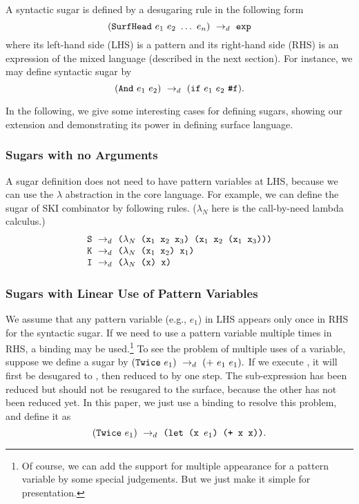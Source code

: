 A syntactic sugar  is defined by a desugaring rule in the following form
\[
\drule{(\m{SurfHead}~e_1~e_2~\ldots~e_n)}{\m{exp}} %
\]
where its left-hand side (LHS) is a pattern and its right-hand side (RHS) is an expression of the mixed language (described in the next section).
For instance, we may define syntactic sugar  by
\[
(\mbox{\tt And}~e_1~e_2) ~\rightarrow_d~ (\mbox{\tt if}~e_1~e_2~\mbox{\tt \#f}).
\]

In the following, we give some interesting cases for defining sugars, showing our extension and demonstrating its power in defining surface language.

\subsubsection{Sugars with no Arguments}
\label{mark:SKI}
A sugar definition does not need to have pattern variables at LHS, because we can use the $\lambda$ abstraction in the core language. For example, we can define the sugar of SKI combinator by following rules. ($\lambda_N$ here is the call-by-need lambda calculus.)
\[
\begin{array}{l}
\mbox{\tt S} ~\rightarrow_d~ \texttt{($\lambda_N$ ($\mbox{\tt x}_1$ $\mbox{\tt x}_2$ $\mbox{\tt x}_3$) ($\mbox{\tt x}_1$ $\mbox{\tt x}_2$ ($\mbox{\tt x}_1$ $\mbox{\tt x}_3$)))}\\
\mbox{\tt K} ~\rightarrow_d~ \texttt{($\lambda_N$ ($\mbox{\tt x}_1$ $\mbox{\tt x}_2$) $\mbox{\tt x}_1$)}\\
\mbox{\tt I} ~\rightarrow_d~ \texttt{($\lambda_N$ (x) x)}
\end{array}
\]

\subsubsection{Sugars with Linear Use of Pattern Variables}
We assume that any pattern variable (e.g., $e_1$) in LHS appears only once in RHS for the syntactic sugar.
If we need to use a pattern variable multiple times in RHS, a  binding may be used.\footnote{Of course, we can add the support for multiple appearance for a pattern variable by some special judgements. But we just make it simple for presentation.} To see the problem of multiple uses of a variable, suppose we define a sugar by
$
(\mbox{\tt Twice}~e_1) ~\rightarrow_d~ (+~e_1~e_1).
$
If we execute , it will first be desugared to , then reduced to  by one step. The sub-expression  has been reduced but should not be resugared to the surface, because the other  has not been reduced yet.
In this paper, we just use a  binding to resolve this problem, and define it as
\[
(\mbox{\tt Twice}~e_1) ~\rightarrow_d~ \texttt{(let (x $e_1$) (+ x x))}.
\]

